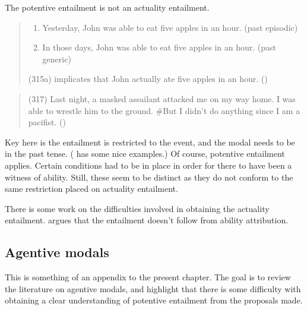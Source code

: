 \begin{note}
  The potentive entailment is not an actuality entailment.

  \begin{quote}
    \begin{enumerate}
    \item Yesterday, John was able to eat five apples in an hour. (past episodic)
    \item In those days, John was able to eat five apples in an hour. (past generic)
    \end{enumerate}
    (315a) implicates that John actually ate five apples in an hour.\nolinebreak
    \mbox{}\hfill\mbox{(\citeyear[173]{Bhatt:2008aa})}
  \end{quote}

  \begin{quote}
    (317) Last night, a masked assailant attacked me on my way home.
    I was able to wrestle him to the ground.
    \#But I didn't do anything since I am a pacifist.\nolinebreak
    \mbox{}\hfill\mbox{(\citeyear[174]{Bhatt:2008aa})}
  \end{quote}

  Key here is the entailment is restricted to the event, and the modal needs to be in the past tense.
  (\textcite{Pinon:2003te} has some nice examples.)
  Of course, potentive entailment applies.
  Certain conditions had to be in place in order for there to have been a witness of ability.
  Still, these seem to be distinct as they do not conform to the same restriction placed on actuality entailment.

  There is some work on the difficulties involved in obtaining the actuality entailment.
  \citeauthor{Bhatt:2008aa,Bhatt:1999ud} argues that the entailment doesn't follow from ability attribution.
\end{note}


\subsection{Agentive modals}
\label{sec:agentive-modals}

\begin{note}[Summary]
  This is something of an appendix to the present chapter.
  The goal is to review the literature on agentive modals, and highlight that there is some difficulty with obtaining a clear understanding of potentive entailment from the proposals made.
\end{note}

